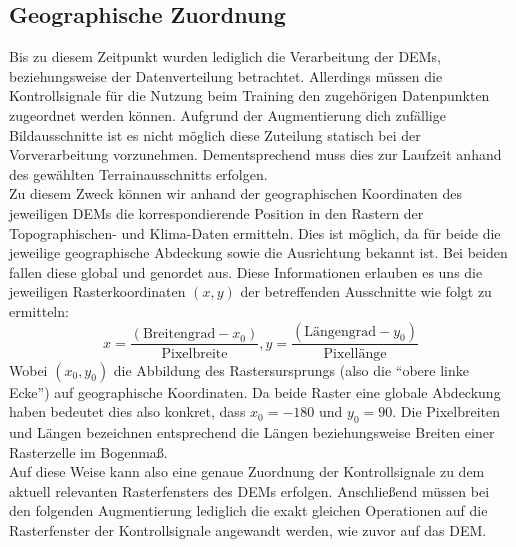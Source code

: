 \subsection{Geographische Zuordnung}

Bis zu diesem Zeitpunkt wurden lediglich die Verarbeitung der \ac{DEM}s, beziehungsweise der Datenverteilung betrachtet. Allerdings müssen die Kontrollsignale für die Nutzung beim Training den zugehörigen Datenpunkten zugeordnet werden können. Aufgrund der Augmentierung dich zufällige Bildausschnitte ist es nicht möglich diese Zuteilung statisch bei der Vorverarbeitung vorzunehmen. Dementsprechend muss dies zur Laufzeit anhand des gewählten Terrainausschnitts erfolgen. \\
Zu diesem Zweck können wir anhand der geographischen Koordinaten des jeweiligen \ac{DEM}s die korrespondierende Position in den Rastern der Topographischen- und Klima-Daten ermitteln. Dies ist möglich, da für beide die jeweilige geographische Abdeckung sowie die Ausrichtung bekannt ist. Bei beiden fallen diese global und genordet aus. Diese Informationen erlauben es uns die jeweiligen Rasterkoordinaten $(x,y)$ der betreffenden Ausschnitte wie folgt zu ermitteln:
\begin{equation}
    x = \frac{(\text{Breitengrad} - x_0)}{\text{Pixelbreite}}, 
    y = \frac{(\text{Längengrad} - y_0)}{\text{Pixellänge}}
\end{equation}
Wobei $(x_0, y_0)$ die Abbildung des Rastersursprungs (also die \enquote{obere linke Ecke}) auf geographische Koordinaten. Da beide Raster eine globale Abdeckung haben bedeutet dies also konkret, dass $x_0 = -180$ und $y_0 = 90$. Die Pixelbreiten und Längen bezeichnen entsprechend die Längen beziehungsweise Breiten einer Rasterzelle im Bogenmaß. \\
Auf diese Weise kann also eine genaue Zuordnung der Kontrollsignale zu dem aktuell relevanten Rasterfensters des \ac{DEM}s erfolgen. Anschließend müssen bei den folgenden Augmentierung lediglich die exakt gleichen Operationen auf die Rasterfenster der Kontrollsignale angewandt werden, wie zuvor auf das \ac{DEM}.  